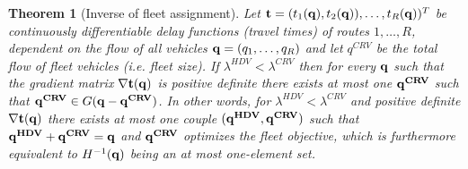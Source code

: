 \documentclass[a4paper,11pt]{article}
\newtheorem{theorem}{Theorem}
\begin{document}
\begin{theorem}[Inverse of fleet assignment]
\label{th_inverse}
Let $\bold{t} = (t_1(\bold{q}), t_2(\bold{q})), \dots, t_R(\bold{q}))^T$ be continuously differentiable delay functions (travel times) of routes $1,\dots, R$, dependent on the flow of all vehicles $\bold{q} = (q_1, \dots, q_R)$ and let $q^{CRV}$ be the total flow of fleet vehicles (i.e. fleet size).  
If $\lambda^{HDV} <  \lambda^{CRV}$ then for every $\bold{q}$ such that the gradient matrix $\nabla \bold{t}(\bold{q})$ is positive definite there exists at most one $\bold{q^{CRV}}$ such that $\bold{q^{CRV}} \in G(\bold{q - q^{CRV}})$. In other words, for $\lambda^{HDV} <  \lambda^{CRV}$ and positive definite $\bold{\nabla t(q)}$ there exists at most one couple $(\bold{q^{HDV}}, \bold{q^{CRV}})$ such that $\bold{q^{HDV}} + \bold{q^{CRV}} = \bold{q}$ and $\bold{q^{CRV}}$ optimizes the fleet objective, which is furthermore equivalent to $H^{-1}(\bold{q})$ being an at most one-element set. 
\end{theorem}
\end{document}
